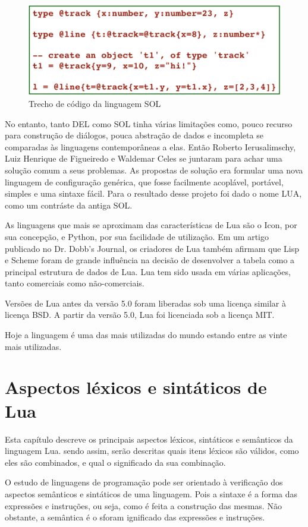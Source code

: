 \documentclass[
12pt, %
openright, %
oneside, %
a4paper, %
english, %
brazil, %
]{abntex2}
\begin{document}
\begin{figure}[H]
\centering
\includegraphics[width=0.5\linewidth]{imagens/imagem2.png}
\caption{Trecho de código da linguagem SOL}
\end{figure}

No entanto, tanto DEL como SOL tinha várias limitações como, pouco recurso para construção de diálogos, pouca abstração de dados e incompleta se comparadas às linguagens contemporâneas a elas. Então Roberto Ierusalimschy, Luiz Henrique de Figueiredo e Waldemar Celes se juntaram para achar uma solução comum a seus problemas. As propostas de solução era formular uma nova linguagem de configuração genérica, que fosse facilmente acoplável, portável, simples e uma sintaxe fácil. Para o resultado desse projeto foi dado o nome LUA, como um contráste da antiga SOL.

As linguagens que mais se aproximam das características de Lua são o Icon, por sua concepção, e Python, por sua facilidade de utilização. Em um artigo publicado no Dr. Dobb's Journal, os criadores de Lua também afirmam que Lisp e Scheme foram de grande influência na decisão de desenvolver a tabela como a principal estrutura de dados de Lua. Lua tem sido usada em várias aplicações, tanto comerciais como não-comerciais.

Versões de Lua antes da versão 5.0 foram liberadas sob uma licença similar à licença BSD. A partir da versão 5.0, Lua foi licenciada sob a licença MIT.

Hoje a linguagem é uma das mais utilizadas do mundo estando entre as vinte mais utilizadas.

\chapter{Aspectos léxicos e sintáticos de Lua}
Esta capítulo descreve os principais aspectos léxicos, sintáticos e semânticos da linguagem Lua. sendo assim, serão descritas quais itens léxicos são válidos, como eles são combinados, e qual o significado da sua combinação.

O estudo de linguagens de programação pode ser orientado à verificação dos aspectos semânticos e sintáticos de uma linguagem. Pois a sintaxe é a forma das expressões e instruções, ou seja, como é feita a construção das mesmas. Não obstante, a semântica é o sforam ignificado das expressões e instruções.
\end{document}
